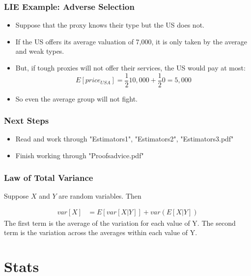 \documentclass[aspectratio=169, handout]{beamer}
\numberwithin{equation}{section}
\begin{document}
\begin{frame}
\frametitle{LIE Example: Adverse Selection}
\begin{itemize}
\item  Suppose that the proxy knows their type but the US does not.\pause
\item If the US offers its average valuation of 7,000, it is only taken by the average and weak types.\pause
\item But, if tough proxies will not offer their services, the US would pay at most:
$$E[price_{USA}]=\frac{1}{2}10,000+\frac{1}{2}0=5,000$$
\item So even the average group will not fight.
\end{itemize}
\end{frame}


\begin{frame}
\frametitle{Next Steps}
\begin{itemize}
\item Read and work through "Estimators1", "Estimators2", "Estimators3.pdf"
\item Finish working through "Proofsadvice.pdf"
\end{itemize}
\end{frame}

\begin{frame}
\frametitle{Law of Total Variance}
Suppose $X$ and $Y$ are random variables.  Then 

\begin{align*}
var[X] &= E[var[X|Y]]+var(E[X|Y])  
\end{align*}
The first term is the average of the variation for each value of Y.\pause
The second term is the variation across the averages within each value of Y.
\end{frame}

\section{Stats}
\end{document}
